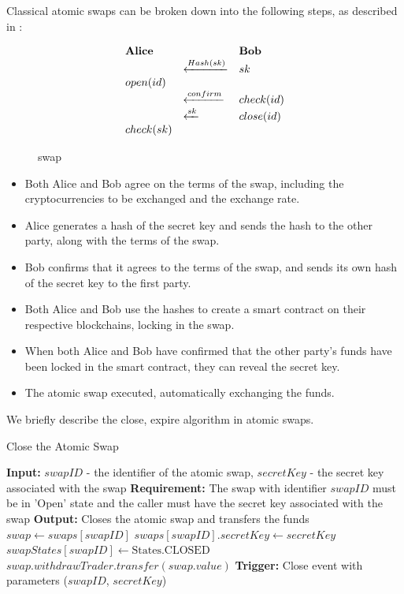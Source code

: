 \documentclass[twocolumn]{article}
\begin{document}
Classical atomic swaps can be broken down into the following steps, as described in \cite{eth-atomic-swap}:

\begin{figure}
\[
\begin{array}{l l l}
  \text{\textbf{Alice}} & & \text{\textbf{Bob}} \\
    &\xleftarrow{Hash(sk)} & sk  \\
  open(id) & & \\
                        & \xleftarrow{confirm} & check(id) \\
                        & \xleftarrow{sk} & close(id) \\
  check(sk) & & \\
\end{array}
\]
\label{swap}
\caption{swap}
\end{figure}



\begin{itemize}[itemsep=2pt,topsep=0pt,parsep=0pt]

 \item   Both Alice and Bob agree on the terms of the swap, including the cryptocurrencies to be exchanged and the exchange rate.
\item    Alice generates a hash of the secret key and sends the hash to the other party, along with the terms of the swap.
\item     Bob confirms that it agrees to the terms of the swap, and sends its own hash of the secret key to the first party.
\item    Both Alice and Bob use the hashes to create a smart contract on their respective blockchains, locking in the swap.
\item    When both Alice and Bob have confirmed that the other party's funds have been locked in the smart contract, they can reveal the secret key.
\item    The atomic swap executed, automatically exchanging the funds.
\end{itemize}
We briefly describe the close, expire algorithm in atomic swaps.

\begin{algorithm}[htbp]
\caption{Close the Atomic Swap}
\begin{algorithmic}[1]
\State \textbf{Input:} $swapID$ - the identifier of the atomic swap, $secretKey$ - the secret key associated with the swap
\State \textbf{Requirement:} The swap with identifier $swapID$ must be in 'Open' state and the caller must have the secret key associated with the swap
\State \textbf{Output:} Closes the atomic swap and transfers the funds
\State $swap \gets swaps[swapID]$
\State $swaps[swapID].secretKey \gets secretKey$
\State $swapStates[swapID] \gets \text{States.CLOSED}$
\State $swap.withdrawTrader.transfer(swap.value)$
\State \textbf{Trigger:} Close event with parameters ($swapID$, $secretKey$)
\EndFunction
\end{algorithmic}
\end{algorithm}
\end{document}
